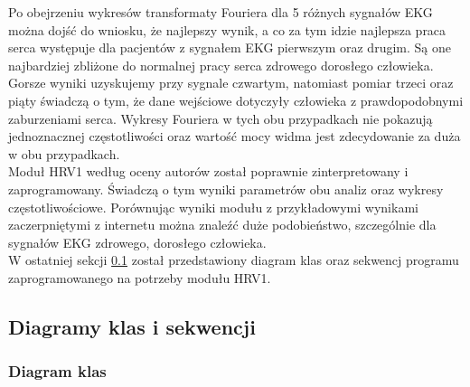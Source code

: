 Po obejrzeniu wykresów transformaty Fouriera dla 5 różnych sygnałów EKG można dojść do wniosku, że najlepszy wynik, a co za tym idzie najlepsza praca serca występuje dla pacjentów z sygnałem EKG pierwszym oraz drugim. Są one najbardziej zbliżone do normalnej pracy serca zdrowego dorosłego człowieka. Gorsze wyniki uzyskujemy przy sygnale czwartym, natomiast pomiar trzeci oraz piąty świadczą o tym, że dane wejściowe dotyczyły człowieka z prawdopodobnymi zaburzeniami serca. Wykresy Fouriera w tych obu przypadkach nie pokazują jednoznacznej częstotliwości oraz wartość mocy widma jest zdecydowanie za duża w obu przypadkach.\\
\tab Moduł HRV1 według oceny autorów został poprawnie zinterpretowany i zaprogramowany. Świadczą o tym wyniki parametrów obu analiz oraz wykresy częstotliwościowe. Porównując wyniki modułu z przykładowymi wynikami zaczerpniętymi z internetu można znaleźć duże podobieństwo, szczególnie dla sygnałów EKG zdrowego, dorosłego człowieka. \\
W ostatniej sekcji \ref{sec:diag} został przedstawiony diagram klas oraz sekwencj programu zaprogramowanego na potrzeby modułu HRV1.


\subsection{Diagramy klas i sekwencji}
\label{sec:diag}

\subsubsection{Diagram klas}

